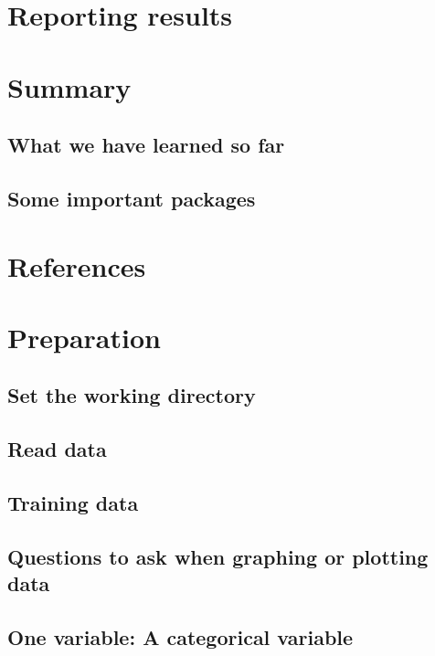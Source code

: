 \documentclass[]{book}
\theoremstyle{definition}
\theoremstyle{definition}
\theoremstyle{definition}
\theoremstyle{remark}
\begin{document}
\chapter{Reporting results}\label{reporting-results}

\chapter{Summary}\label{summary-3}

\section{What we have learned so far}\label{what-we-have-learned-so-far}

\section{Some important packages}\label{some-important-packages}

\chapter{References}\label{references}

\chapter{Preparation}\label{preparation}

\section{Set the working directory}\label{set-the-working-directory}

\section{Read data}\label{read-data}

\section{Training data}\label{training-data}

\section{Questions to ask when graphing or plotting
data}\label{questions-to-ask-when-graphing-or-plotting-data}

\section{One variable: A categorical
variable}\label{one-variable-a-categorical-variable}
\end{document}
